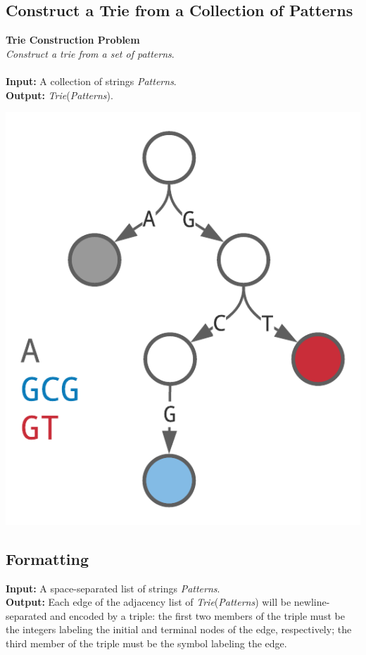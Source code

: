 \documentclass{article}
\begin{document}
\subsection{Construct a Trie from a Collection of Patterns} 
\hline \vspace{5}
\textbf{Trie Construction Problem}\\
\emph{Construct a trie from a set of patterns}.\\ \\
\textbf{Input:} A collection of strings \emph{Patterns}.\\
\textbf{Output:} \emph{Trie}(\emph{Patterns}).
\begin{center}
    \includegraphics[scale=0.2]{c9/logos/9A.png}
\end{center}
\hline\vspace{5}

\subsection*{Formatting}
\noindent\textbf{Input:} A space-separated list of strings \emph{Patterns}.\\
\noindent\textbf{Output:} Each edge of the adjacency list of \emph{Trie}(\emph{Patterns}) will be newline-separated and encoded by a triple: the first two members of the triple must be the integers labeling the initial and terminal nodes of the edge, respectively; the third member of the triple must be the symbol labeling the edge.
\end{document}
